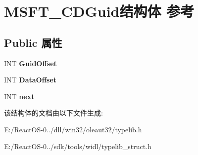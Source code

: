 \hypertarget{struct_m_s_f_t___c_d_guid}{}\section{M\+S\+F\+T\+\_\+\+C\+D\+Guid结构体 参考}
\label{struct_m_s_f_t___c_d_guid}
\subsection*{Public 属性}
\begin{DoxyCompactItemize}
\item 
\mbox{\label{struct_m_s_f_t___c_d_guid_acedf533e802822b1963b9fd668e21df8}} 
I\+NT {\bfseries Guid\+Offset}
\item 
\mbox{\label{struct_m_s_f_t___c_d_guid_abe5656c78e674c6711e58a13b079192a}} 
I\+NT {\bfseries Data\+Offset}
\item 
\mbox{\label{struct_m_s_f_t___c_d_guid_a5929c3215456cc11ba1b36260924b034}} 
I\+NT {\bfseries next}
\end{DoxyCompactItemize}


该结构体的文档由以下文件生成\+:\begin{DoxyCompactItemize}
\item 
E\+:/\+React\+O\+S-\/0../dll/win32/oleaut32/typelib.\+h\item 
E\+:/\+React\+O\+S-\/0../sdk/tools/widl/typelib\+\_\+struct.\+h\end{DoxyCompactItemize}
